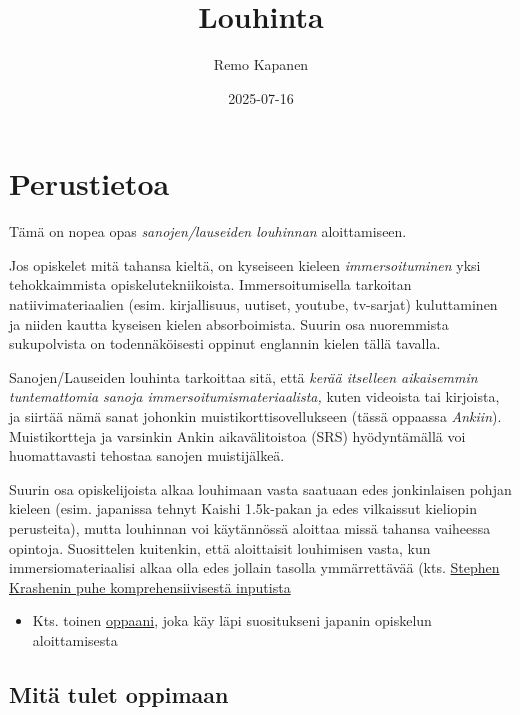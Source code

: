 \documentclass[
]{book}
\title{Louhinta}
\author{Remo Kapanen}
\date{2025-07-16}
\providecommand{\tightlist}{%
  \setlength{\itemsep}{0pt}\setlength{\parskip}{0pt}}
\begin{document}
\maketitle

{
\setcounter{tocdepth}{1}
\tableofcontents
}
\chapter*{Perustietoa}\label{perustietoa}

Tämä on nopea opas \emph{sanojen/lauseiden louhinnan} aloittamiseen.

Jos opiskelet mitä tahansa kieltä, on kyseiseen kieleen \emph{immersoituminen} yksi tehokkaimmista opiskelutekniikoista. Immersoitumisella tarkoitan natiivimateriaalien (esim. kirjallisuus, uutiset, youtube, tv-sarjat) kuluttaminen ja niiden kautta kyseisen kielen absorboimista. Suurin osa nuoremmista sukupolvista on todennäköisesti oppinut englannin kielen tällä tavalla.

Sanojen/Lauseiden louhinta tarkoittaa sitä, että \emph{kerää itselleen aikaisemmin tuntemattomia sanoja immersoitumismateriaalista,} kuten videoista tai kirjoista, ja siirtää nämä sanat johonkin muistikorttisovellukseen (tässä oppaassa \emph{Ankiin}). Muistikortteja ja varsinkin Ankin aikavälitoistoa (SRS) hyödyntämällä voi huomattavasti tehostaa sanojen muistijälkeä.

Suurin osa opiskelijoista alkaa louhimaan vasta saatuaan edes jonkinlaisen pohjan kieleen (esim. japanissa tehnyt Kaishi 1.5k-pakan ja edes vilkaissut kieliopin perusteita), mutta louhinnan voi käytännössä aloittaa missä tahansa vaiheessa opintoja.
Suosittelen kuitenkin, että aloittaisit louhimisen vasta, kun immersiomateriaalisi alkaa olla edes jollain tasolla ymmärrettävää (kts. \href{https://youtu.be/NiTsduRreug?si=Udp5c-lxH75kVLqy}{Stephen Krashenin puhe komprehensiivisestä inputista}

\begin{itemize}
\tightlist
\item
  Kts. toinen \href{https://remokapanen.com/project/kielten-perusteet/}{oppaani}, joka käy läpi suositukseni japanin opiskelun aloittamisesta
\end{itemize}

\section*{Mitä tulet oppimaan}\label{mituxe4-tulet-oppimaan}
\end{document}
